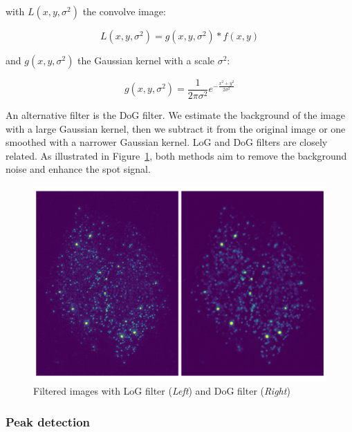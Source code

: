\noindent
with $L(x, y, \sigma^2)$ the convolve image:

\begin{equation}
	{\displaystyle L(x, y, \sigma^2) = g(x, y, \sigma^2) * f(x, y)}
\end{equation}

\noindent
and $g(x, y, \sigma^2)$ the Gaussian kernel with a scale $\sigma^2$:

\begin{equation}
	{\displaystyle g(x, y, \sigma^2) = \frac{1}{2\pi \sigma^2} e^{-{\frac{x^{2} + y^{2}}{2\sigma^2}}}}
\end{equation}

An alternative filter is the \ac{DoG} filter.
We estimate the background of the image with a large Gaussian kernel, then we subtract it from the original image or one smoothed with a narrower Gaussian kernel.
\ac{LoG} and \ac{DoG} filters are closely related. 
As illustrated in Figure~\ref{fig:filters_detection}, both methods aim to remove the background noise and enhance the spot signal.


\begin{figure}[h]
    \centering
    \includegraphics[width=1\textwidth]{figures/chapter2/filter_background}
    \caption{Filtered images with LoG filter (\textit{Left}) and DoG filter (\textit{Right})}
    \label{fig:filters_detection}
\end{figure}

\subsubsection{Peak detection}

